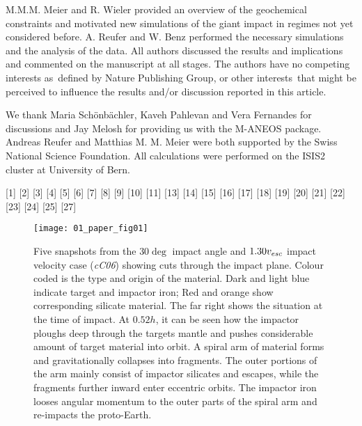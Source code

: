 M.M.M. Meier and R. Wieler provided an overview of the geochemical constraints and motivated new simulations of the giant impact in regimes not yet considered before. A. Reufer and W. Benz performed the necessary simulations and the analysis of the data. All authors discussed the results and implications and commented on the manuscript at all stages. The authors have no competing interests as defined by Nature Publishing Group, or other interests that might be perceived to influence the results and/or discussion reported in this article.

We thank Maria Schönbächler, Kaveh Pahlevan and Vera Fernandes for discussions and Jay Melosh for providing us with the M-ANEOS package. Andreas Reufer and Matthias M. M. Meier were both supported by the Swiss National Science Foundation. All calculations were performed on the ISIS2 cluster at University of Bern.

[1] \cite{1976LPI.....7..120C}
[2] \cite{Canup:2001p1861}
[3] \cite{Pahlevan:2007p2065}
[4] \cite{2011E&PSL.301..433P}
[5] \cite{Canup:2001p3295}
[6] \cite{Canup:2004p115}
[7] \cite{Wiechert:2001p3543}
[8] \cite{Clayton:1993p3544}
[9] \cite{2009E&PSL.287...77F}
[10] \cite{2007Natur.447.1102G}
[11] \cite{2005E&PSL.236...78W}
[13] \cite{2000SSRv...92..225S}
[14] \cite{2007Natur.450.1206T}
[15] \cite{2010E&PSL.292..363N}
[16] \cite{Asphaug:2006p3729}
[17] \cite{2006Icar..184...39O}
[18] \cite{1972Thompson}
[19] \cite{Melosh:2007p3502}
[20] \cite{Benz:1985p1755}
[21] \cite{Kokubo:2000p2195}
[22] \cite{Asphaug:2010p3539}
[23] \cite{2010Sci...328..884S}
[24] \cite{2006mess.book..803R}
[25] \cite{2010LPI....41.2653F}
[27] \cite{2009GeCoA..73.5150K}



\begin{figure}
\begin{center}
\texttt{[image: 01\_paper\_fig01]}
\caption{Five snapshots from the $30 \deg$ impact angle and $1.30 v_{esc}$ impact velocity case (\emph{cC06}) showing cuts through the impact plane. Colour coded is the type and origin of the material. Dark and light blue indicate target and impactor iron; Red and orange show corresponding silicate material. The far right shows the situation at the time of impact. At $0.52 h$, it can be seen how the impactor ploughs deep through the targets mantle and pushes considerable amount of target material into orbit. A spiral arm of material forms and gravitationally collapses into fragments. The outer portions of the arm mainly consist of impactor silicates and escapes, while the fragments further inward enter eccentric orbits. The impactor iron looses angular momentum to the outer parts of the spiral arm and re-impacts the proto-Earth.}
\label{ch05_fig01a}
\end{center}
\end{figure}

